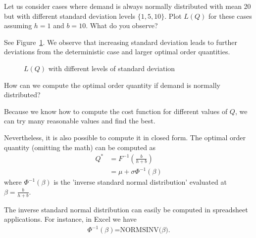 \begin{question}
Let us consider cases where demand is always normally distributed with mean 20 but with different standard deviation levels $\{1,5,10\}$. Plot $L(Q)$ for these cases assuming $h=1$ and $b=10$. What do you observe?
\end{question}

\begin{solution}
See Figure~\ref{fig:LQ_std}. We observe that increasing standard deviation leads to further deviations from the deterministic case and larger optimal order quantities. 

\begin{figure}[htbp]
\centering
{}
\caption{$L(Q)$ with different levels of standard deviation}
\label{fig:LQ_std}
\end{figure}
\end{solution}

\begin{question}
How can we compute the optimal order quantity if demand is normally distributed?
\end{question}

\begin{solution}
Because we know how to compute the cost function for different values of $Q$, we can try many reasonable values and find the best. 

Nevertheless, it is also possible to compute it in closed form. The optimal order quantity (omitting the math) can be computed as 
\begin{align*}
Q^* 
& = F^{-1}\left(\frac{b}{h+b}\right) \\
& = \mu + \sigma \Phi^{-1}(\beta) 
\end{align*}
where $\Phi^{-1}(\beta)$ is the 'inverse standard normal distribution' evaluated at $\beta=\frac{b}{h+b}$. 

The inverse standard normal distribution can easily be computed in spreadsheet applications. For instance, in Excel we have 
\begin{align*}
\Phi^{-1}(\beta)\text{=NORMSINV($\beta$)}.
\end{align*}
\end{solution}

